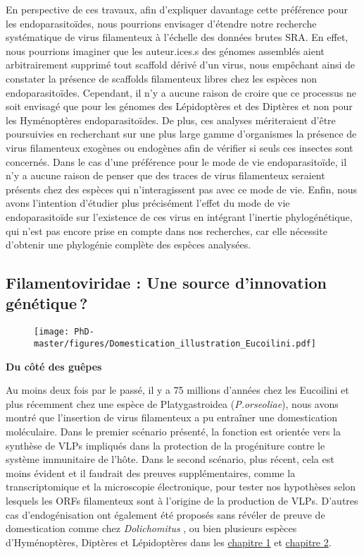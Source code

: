 En perspective de ces travaux, afin d'expliquer davantage cette préférence pour les endoparasitoïdes, nous pourrions envisager d'étendre notre recherche systématique de virus filamenteux à l'échelle des données brutes SRA. En effet, nous pourrions imaginer que les auteur.ices.s des génomes assemblés aient arbitrairement supprimé tout scaffold dérivé d'un virus, nous empêchant ainsi de constater la présence de scaffolds filamenteux libres chez les espèces non endoparasitoïdes. Cependant, il n'y a aucune raison de croire que ce processus ne soit envisagé que pour les génomes des Lépidoptères et des Diptères et non pour les Hyménoptères endoparasitoïdes. De plus, ces analyses mériteraient d'être poursuivies en recherchant sur une plus large gamme d'organismes la présence de virus filamenteux exogènes ou endogènes afin de vérifier si seuls ces insectes sont concernés. Dans le cas d'une préférence pour le mode de vie endoparasitoïde, il n'y a aucune raison de penser que des traces de virus filamenteux seraient présents chez des espèces qui n'interagissent pas avec ce mode de vie. Enfin, nous avons l'intention d'étudier plus précisément l'effet du mode de vie endoparasitoïde sur l'existence de ces virus en intégrant l'inertie phylogénétique, qui n'est pas encore prise en compte dans nos recherches, car elle nécessite d'obtenir une phylogénie complète des espèces analysées. \newpage


\subsection{Filamentoviridae : Une source d'innovation génétique ?}

\begin{figure}[H]
\captionsetup{font=footnotesize}
 \centering
  \texttt{[image: PhD-master/figures/Domestication\_illustration\_Eucoilini.pdf]}
\label{figure:Domestication_illustration_Eucoilini}
\end{figure}

\textbf{Du côté des guêpes}

Au moins deux fois par le passé, il y a 75 millions d'années chez les Eucoilini et plus récemment chez une espèce de Platygastroidea (\textit{P.orseoliae}), nous avons montré que l'insertion de virus filamenteux a pu entraîner une domestication moléculaire. Dans le premier scénario présenté, la fonction est orientée vers la synthèse de VLPs impliqués dans la protection de la progéniture contre le système immunitaire de l'hôte. Dans le second scénario, plus récent, cela est moins évident et il faudrait des preuves supplémentaires, comme la transcriptomique et la microscopie électronique, pour tester nos hypothèses selon lesquels les ORFs filamenteux sont à l'origine de la production de VLPs. D'autres cas d'endogénisation ont également été proposés sans révéler de preuve de domestication comme chez \textit{Dolichomitus} \citep{burke_endogenization_2020}, ou bien plusieurs espèces d'Hyménoptères, Diptères et Lépidoptères dans les \hyperref[sec:chap1]{chapitre 1} et \hyperref[sec:chap2]{chapitre 2}.\\

